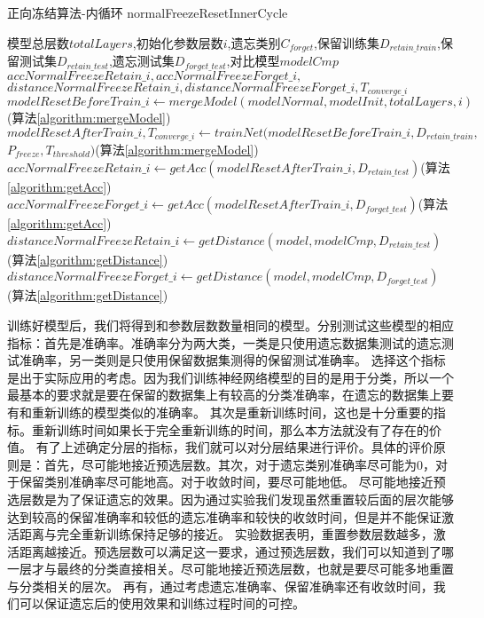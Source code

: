 \begin{algorithm}
	\renewcommand{\algorithmicrequire}{\textbf{Input:}}
	\renewcommand{\algorithmicensure}{\textbf{Output:}}
	\caption{正向冻结算法-内循环 normalFreezeResetInnerCycle}
	\label{algorithm:normalFreezeResetInnerCycle}
	\begin{algorithmic}[1]
        \REQUIRE 模型总层数$totalLayers$,初始化参数层数$i$,遗忘类别$C_{forget}$,保留训练集$D_{retain\_train}$,保留测试集$D_{retain\_test}$,遗忘测试集$D_{forget\_test}$,对比模型$modelCmp$
        \ENSURE  $accNormalFreezeRetain\_i,accNormalFreezeForget\_i,$\\$distanceNormalFreezeRetain\_i,distanceNormalFreezeForget\_i,T_{converge\_i}$
		\STATE $modelResetBeforeTrain\_i \gets mergeModel(modelNormal, modelInit, totalLayers, i)$(算法\ref{algorithm:mergeModel})
        \STATE $modelResetAfterTrain\_i,T_{converge\_i} \gets trainNet(modelResetBeforeTrain\_i , D_{retain\_train},$\\$ P_{freeze}, T_{threshold})$(算法\ref{algorithm:mergeModel})
        \STATE $accNormalFreezeRetain\_i \gets getAcc(modelResetAfterTrain\_i, D_{retain\_test})$(算法\ref{algorithm:getAcc})
        \STATE $accNormalFreezeForget\_i  \gets getAcc(modelResetAfterTrain\_i, D_{forget\_test})$(算法\ref{algorithm:getAcc})
        \STATE $distanceNormalFreezeRetain\_i \gets getDistance(model, modelCmp, D_{retain\_test})$(算法\ref{algorithm:getDistance})
        \STATE $distanceNormalFreezeForget\_i \gets getDistance(model, modelCmp, D_{forget\_test})$(算法\ref{algorithm:getDistance})
	\end{algorithmic}  
\end{algorithm}

训练好模型后，我们将得到和参数层数数量相同的模型。分别测试这些模型的相应指标：首先是准确率。准确率分为两大类，一类是只使用遗忘数据集测试的遗忘测试准确率，另一类则是只使用保留数据集测得的保留测试准确率。
选择这个指标是出于实际应用的考虑。因为我们训练神经网络模型的目的是用于分类，所以一个最基本的要求就是要在保留的数据集上有较高的分类准确率，在遗忘的数据集上要有和重新训练的模型类似的准确率。
其次是重新训练时间，这也是十分重要的指标。重新训练时间如果长于完全重新训练的时间，那么本方法就没有了存在的价值。
有了上述确定分层的指标，我们就可以对分层结果进行评价。具体的评价原则是：首先，尽可能地接近预选层数。其次，对于遗忘类别准确率尽可能为0，对于保留类别准确率尽可能地高。对于收敛时间，要尽可能地低。
尽可能地接近预选层数是为了保证遗忘的效果。因为通过实验我们发现虽然重置较后面的层次能够达到较高的保留准确率和较低的遗忘准确率和较快的收敛时间，但是并不能保证激活距离与完全重新训练保持足够的接近。
实验数据表明，重置参数层数越多，激活距离越接近。预选层数可以满足这一要求，通过预选层数，我们可以知道到了哪一层才与最终的分类直接相关。尽可能地接近预选层数，也就是要尽可能多地重置与分类相关的层次。
再有，通过考虑遗忘准确率、保留准确率还有收敛时间，我们可以保证遗忘后的使用效果和训练过程时间的可控。

